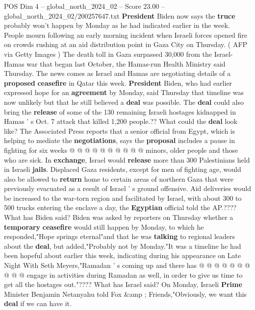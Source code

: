 \begin{textsample}{POS Dim 4 – global\_north\_2024\_02 – Score 23.00 – global\_north\_2024\_02/200257647.txt}  \label{ex:f4_pos_189}
\textbf{President} Biden now says the \textbf{truce} probably won't happen by Monday as he had indicated earlier in the week.
People mourn following an early morning incident when Israeli forces opened fire on crowds rushing at an aid distribution point in Gaza City on Thursday. ( AFP via Getty Images ) The death toll in Gaza surpassed 30,000 from the Israel-Hamas war that began last October, the Hamas-run Health Ministry said Thursday.
The news comes as Israel and Hamas are negotiating details of a \textbf{proposed} \textbf{ceasefire} in Qatar this week. \textbf{President} Biden, who had earlier expressed hope for an \textbf{agreement} by Monday, said Thursday that timeline was now unlikely but that he still believed a \textbf{deal} was possible.
The \textbf{deal} could also bring the \textbf{release} of some of the 130 remaining Israeli hostages kidnapped in Hamas ' s Oct. 7 attack that killed 1,200 people.??
What could the \textbf{deal} look like?
The Associated Press reports that a senior official from Egypt, which is helping to mediate the \textbf{negotiations}, says the \textbf{proposal} includes a pause in fighting for six weeks @ @ @ @ @ @ @ @ @ @ minors, older people and those who are sick.
In \textbf{exchange}, Israel would \textbf{release} more than 300 Palestinians held in Israeli \textbf{jails}.
Displaced Gaza residents, except for men of fighting age, would also be allowed to \textbf{return} home to certain areas of northern Gaza that were previously evacuated as a result of Israel ' s ground offensive.
Aid deliveries would be increased to the war-torn region and facilitated by Israel, with about 300 to 500 trucks entering the enclave a day, the \textbf{Egyptian} official told the AP.????
What has Biden said?
Biden was asked by reporters on Thursday whether a \textbf{temporary} \textbf{ceasefire} would still happen by Monday, to which he responded,"Hope springs eternal"and that he was \textbf{talking} to regional leaders about the \textbf{deal}, but added,"Probably not by Monday."It was a timeline he had been hopeful about earlier this week, indicating during his appearance on Late Night With Seth Meyers,"Ramadan ' s coming up and there has @ @ @ @ @ @ @ @ @ @ engage in activities during Ramadan as well, in order to give us time to get all the hostages out."????
What has Israel said?
On Monday, Israeli \textbf{Prime} Minister Benjamin Netanyahu told Fox \&amp ; Friends,"Obviously, we want this \textbf{deal} if we can have it.

\end{textsample}
